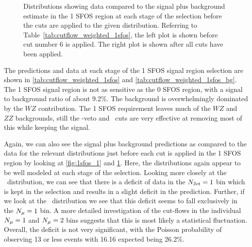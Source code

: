 \begin{figure}[ht!]
\caption{Distributions showing data compared to the signal plus background estimate in the 1 SFOS region at each stage 
of the selection before the cuts are applied to the given distribution. 
Referring to Table~\ref{tab:cutflow_weighted_1sfos}, the left
plot is shown before cut number 6 is applied. The right plot is shown
after all cuts have been applied.}
\label{fig:1sfos_2}
\end{figure}


The predictions and data
at each stage of the 1 SFOS signal region selection are shown in
\tab\ref{tab:cutflow_weighted_1sfos}
and 
\tab\ref{tab:cutflow_weighted_1sfos_bg}. 
The 1 SFOS signal region is not as sensitive as the 0 SFOS region, with 
a signal to background ratio of about 9.2\%.
The background is overwhelmingly dominated by the $WZ$ contribution. 
The 1 SFOS requirement leaves much of the $WZ$ and $ZZ$ backgrounds,
still the \z-veto and \MET~cuts
are very effective at removing most of this while keeping the signal.


Again, we can also see the signal plus background predictions as 
compared to the data
for the relevant distributions just before each cut is applied in 
the 1 SFOS region by looking at \fig\ref{fig:1sfos_1} and \fig\ref{fig:1sfos_2}. 
Here, the distributions again appear to be well modeled
at each stage of the selection.  Looking more closely
at the \njet~distribution, we can see that there is a deficit
of data in the $N_{\textrm{Jet}}=1$ bin which is kept in the selection
and results in a slight deficit in the prediction. 
Further, if we look at the \nmu~distribution we see that
this deficit seems to fall exclusively in the $N_{\mu}=1$ bin.
A more detailed investigation of the cut-flows
in the individual $N_{\mu}=1$ and $N_{\mu}=2$ bins suggests that 
this is most likely a statistical fluctuation.
Overall, the deficit is not very significant, with the Poisson
probability of observing 13 or less events with 16.16 expected
being 26.2\%.


